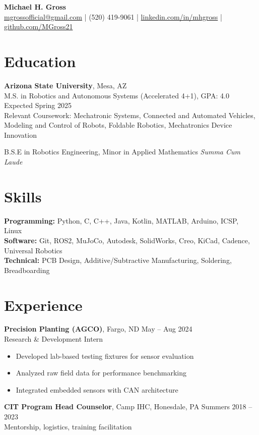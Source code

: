 \documentclass[11pt]{article}
\begin{document}
\begin{center}
    {\LARGE \textbf{Michael H. Gross}} \\
    \href{mailto:mgrossofficial@gmail.com}{mgrossofficial@gmail.com} | (520) 419-9061 | 
    \href{https://www.linkedin.com/in/mhgross}{linkedin.com/in/mhgross} | \href{https://github.com/MGross21}{github.com/MGross21}
\end{center}

\section*{Education}
\textbf{Arizona State University}, Mesa, AZ \\
M.S. in Robotics and Autonomous Systems (Accelerated 4+1), GPA: 4.0 \hfill Expected Spring 2025 \\
Relevant Coursework: Mechatronic Systems, Connected and Automated Vehicles, Modeling and Control of Robots, Foldable Robotics, Mechatronics Device Innovation

B.S.E in Robotics Engineering, Minor in Applied Mathematics \hfill \textit{Summa Cum Laude}

\section*{Skills}
\textbf{Programming:} Python, C, C++, Java, Kotlin, MATLAB, Arduino, ICSP, Linux \\
\textbf{Software:} Git, ROS2, MuJoCo, Autodesk, SolidWorks, Creo, KiCad, Cadence, Universal Robotics \\
\textbf{Technical:} PCB Design, Additive/Subtractive Manufacturing, Soldering, Breadboarding

\section*{Experience}
\textbf{Precision Planting (AGCO)}, Fargo, ND \hfill May – Aug 2024 \\
Research \& Development Intern
\begin{itemize}
  \item Developed lab-based testing fixtures for sensor evaluation
  \item Analyzed raw field data for performance benchmarking
  \item Integrated embedded sensors with CAN architecture
\end{itemize}

\textbf{CIT Program Head Counselor}, Camp IHC, Honesdale, PA \hfill Summers 2018 – 2023 \\
Mentorship, logistics, training facilitation
\end{document}
